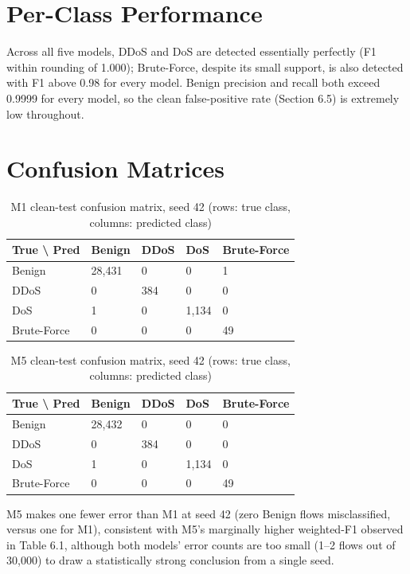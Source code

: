\documentclass[12pt,a4paper]{report}
\begin{document}
\section{Per-Class Performance}
Across all five models, DDoS and DoS are detected essentially perfectly (F1 within rounding of 1.000); Brute-Force, despite its small support, is also detected with F1 above 0.98 for every model. Benign precision and recall both exceed 0.9999 for every model, so the clean false-positive rate (Section 6.5) is extremely low throughout.

\section{Confusion Matrices}
\begin{table}[h]\centering
\caption{M1 clean-test confusion matrix, seed 42 (rows: true class, columns: predicted class)}
\begin{tabularx}{\linewidth}{XXXXX}
\toprule
\textbf{True \textbackslash{} Pred} & \textbf{Benign} & \textbf{DDoS} & \textbf{DoS} & \textbf{Brute-Force} \\
\midrule
Benign & 28,431 & 0 & 0 & 1 \\
DDoS & 0 & 384 & 0 & 0 \\
DoS & 1 & 0 & 1,134 & 0 \\
Brute-Force & 0 & 0 & 0 & 49 \\
\bottomrule
\end{tabularx}
\end{table}
\begin{table}[h]\centering
\caption{M5 clean-test confusion matrix, seed 42 (rows: true class, columns: predicted class)}
\begin{tabularx}{\linewidth}{XXXXX}
\toprule
\textbf{True \textbackslash{} Pred} & \textbf{Benign} & \textbf{DDoS} & \textbf{DoS} & \textbf{Brute-Force} \\
\midrule
Benign & 28,432 & 0 & 0 & 0 \\
DDoS & 0 & 384 & 0 & 0 \\
DoS & 1 & 0 & 1,134 & 0 \\
Brute-Force & 0 & 0 & 0 & 49 \\
\bottomrule
\end{tabularx}
\end{table}
M5 makes one fewer error than M1 at seed 42 (zero Benign flows misclassified, versus one for M1), consistent with M5's marginally higher weighted-F1 observed in Table 6.1, although both models' error counts are too small (1--2 flows out of 30,000) to draw a statistically strong conclusion from a single seed.
\end{document}
